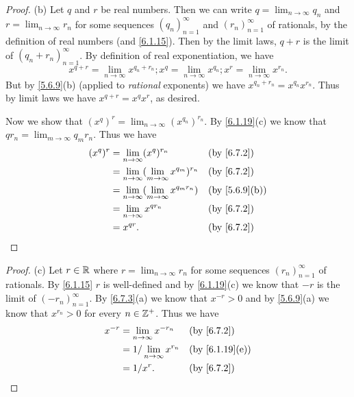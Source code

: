 \begin{proof}{(b)}
  Let \(q\) and \(r\) be real numbers.
  Then we can write \(q = \lim_{n \to \infty} q_n\) and \(r = \lim_{n \to \infty} r_n\) for some sequences \((q_n)_{n = 1}^\infty\) and \((r_n)_{n = 1}^\infty\) of rationals, by the definition of real numbers (and \cref{6.1.15}).
  Then by the limit laws, \(q + r\) is the limit of \((q_n + r_n)_{n = 1}^\infty\).
  By definition of real exponentiation, we have
  \[
    x^{q + r} = \lim_{n \to \infty} x^{q_n + r_n} ; x^q = \lim_{n \to \infty} x^{q_n} ;  x^r = \lim_{n \to \infty} x^{r_n}.
  \]
  But by \cref{5.6.9}(b) (applied to \emph{rational} exponents) we have \(x^{q_n + r_n} = x^{q_n} x^{r_n}\).
  Thus by limit laws we have \(x^{q + r} = x^q x^r\), as desired.

  Now we show that \((x^q)^r = \lim_{n \to \infty} (x^{q_n})^{r_n}\).
  By \cref{6.1.19}(c) we know that \(q r_n = \lim_{m \to \infty} q_m r_n\).
  Thus we have
  \begin{align*}
    (x^q)^r & = \lim_{n \to \infty} (x^q)^{r_n}                         &  & \text{(by \cref{6.7.2})}    \\
            & = \lim_{n \to \infty} (\lim_{m \to \infty} x^{q_m})^{r_n} &  & \text{(by \cref{6.7.2})}    \\
            & = \lim_{n \to \infty} (\lim_{m \to \infty} x^{q_m r_n})   &  & \text{(by \cref{5.6.9}(b))} \\
            & = \lim_{n \to \infty} x^{q r_n}                           &  & \text{(by \cref{6.7.2})}    \\
            & = x^{qr}.                                                 &  & \text{(by \cref{6.7.2})}
  \end{align*}
\end{proof}

\begin{proof}{(c)}
  Let \(r \in \mathbb{R}\) where \(r = \lim_{n \to \infty} r_n\) for some sequences \((r_n)_{n = 1}^\infty\) of rationals.
  By \cref{6.1.15} \(r\) is well-defined and by \cref{6.1.19}(c) we know that \(-r\) is the limit of \((-r_n)_{n = 1}^\infty\).
  By \cref{6.7.3}(a) we know that \(x^{-r} > 0\) and by \cref{5.6.9}(a) we know that \(x^{r_n} > 0\) for every \(n \in \mathbb{Z}^+\).
  Thus we have
  \begin{align*}
    x^{-r} & = \lim_{n \to \infty} x^{-r_n}    &  & \text{(by \cref{6.7.2})}     \\
           & = 1 / \lim_{n \to \infty} x^{r_n} &  & \text{(by \cref{6.1.19}(e))} \\
           & = 1 / x^r.                        &  & \text{(by \cref{6.7.2})}
  \end{align*}
\end{proof}

